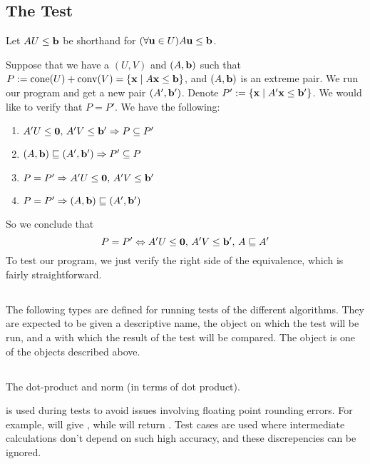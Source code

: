 \subsection{The Test}

Let $AU \leq \mathbf{b}$ be shorthand for $(\forall \mathbf{u}\in U) A\mathbf{u} \leq \mathbf{b}$.

Suppose that we have a $(U,V)$ and $(A,\mathbf{b})$ such that $P := \operatorname{cone}(U) + \operatorname{conv}(V) = \left\{\mathbf{x}\;|\; A\mathbf{x}\leq \mathbf{b}\right\}$, and $(A,\mathbf{b})$ is an extreme pair.  We run our program and get a new pair $(A',\mathbf{b}')$.  Denote $P' := \left\{\mathbf{x}\;|\; A'\mathbf{x}\leq \mathbf{b}'\right\}$.  We would like to verify that $P = P'$.  We have the following:
\begin{enumerate}
  \item $A'U\leq\mathbf{0},\, A'V\leq\mathbf{b}' \Rightarrow P \subseteq P'$
  \item $(A,\mathbf{b}) \sqsubseteq (A',\mathbf{b}') \Rightarrow P' \subseteq P$
  \item $P = P' \Rightarrow A'U\leq\mathbf{0},\, A'V\leq\mathbf{b}'$
  \item $P = P' \Rightarrow (A,\mathbf{b}) \sqsubseteq (A',\mathbf{b}')$
\end{enumerate}

So we conclude that
\[ P = P' \Leftrightarrow A'U\leq\mathbf{0},\,A'V\leq\mathbf{b}',\,A\sqsubseteq A' \]
To test our program, we just verify the right side of the equivalence, which is fairly straightforward.

\subsection{}

The following types are defined for running tests of the different algorithms.  They are expected to be given a descriptive name, the object on which the test will be run, and a  with which the result of the test will be compared.  The  object is one of the objects described above.
\lsthconetestcasea
\lstvconetestcasea
\lsthpolytestcaseb
\lstvpolytestcaseb

\subsection{}

The dot-product and norm (in terms of dot product).
\lstoperator
\lstnorm

 is used during tests to avoid issues involving floating point rounding errors.  For example,  will give , while  will return .  Test cases are used where intermediate calculations don't depend on such high accuracy, and these discrepencies can be ignored.

